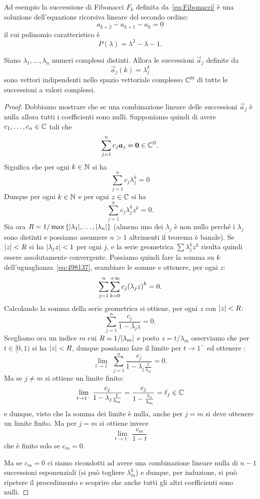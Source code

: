 Ad esempio la successione di Fibonacci $F_k$ definita da~\eqref{eq:Fibonacci}
è una soluzione dell'equazione ricorsiva lineare del secondo ordine:
\[
   a_{k+2} - a_{k+1} - a_{k} = 0
\]
il cui polinomio caratteristico è
\[
  P(\lambda) = \lambda^2 - \lambda - 1.
\]

\begin{theorem}
\label{th:indipendenza_successioni_esponenziali}
Siano $\lambda_1, \dots, \lambda_n$ numeri complessi distinti. Allora
le successioni $\vec a_j$ definite da
\[
  \vec a_j (k) = \lambda_j^k
\]
sono vettori indipendenti nello spazio vettoriale complesso ${\mathbb C}^{\mathbb N}$ di tutte le
successioni a valori complessi.
\end{theorem}
%
\begin{proof}
Dobbiamo mostrare che se una combinazione lineare delle
successioni $\vec a_j$ è nulla allora tutti i coefficienti
sono nulli.
Supponiamo quindi di avere $c_1, \dots, c_n\in {\mathbb C}$ tali che
\[
  \sum_{j=1}^n c_j \boldsymbol a_j = \boldsymbol 0 \in {\mathbb C}^{\mathbb N}.
\]
Significa che per ogni $k\in {\mathbb N}$ si ha
\begin{equation}\label{eq:47862}
  \sum_{j=1}^n c_j \lambda_j^k = 0
\end{equation}
Dunque per ogni $k\in {\mathbb N}$ e per ogni $z\in {\mathbb C}$ si ha
\begin{equation}\label{eq:498137}
  \sum_{j=1}^n c_j \lambda_j^k z^k = 0.
\end{equation}
Sia ora $R=1/\max{\left\{ {\left|\lambda_1\right|}, \dots, {\left|\lambda_n\right|} \right\}}$ (almeno uno dei $\lambda_j$
è non nullo perché i $\lambda_j$ sono distinti e possiamo assumere
$n>1$ altrimenti il teorema è banale).
Se ${\left|z\right|}<R$ si ha ${\left|\lambda_j z\right|}< 1$ per ogni $j$,
e la serie geometrica $\sum \lambda_j^k z^k$ risulta quindi essere
assolutamente convergente. Possiamo quindi fare la somma su $k$
dell'uguaglianza~\eqref{eq:498137}, scambiare le somme e ottenere,
per ogni $z$:
\[
  \sum_{j=1}^n \sum_{k=0}^{+\infty} c_j {\left( \lambda_j z \right)}^k = 0.
\]
Calcolando la somma della serie geometrica si ottiene, per ogni $z$
con ${\left|z\right|}<R$:
\[
\sum_{j=1}^n \frac{c_j}{1-\lambda_j z} = 0.
\]
Scegliamo ora un indice $m$ cui $R = 1/{\left|\lambda_m\right|}$ e
posto $z = t / \lambda_m$ osserviamo che per $t\in[0,1)$
si ha ${\left|z\right|} < R$, dunque possiamo fare il limite
per $t\to 1^-$ ed ottenere :
\[
  \lim_{t\to 1^-}
  \sum_{j=1}^n \frac{c_j}{1- \lambda_j \frac{t}{\lambda_m} } = 0.
\]
Ma se $j\neq m$ si ottiene un limite finito:
\[
  \lim_{t\to 1^-} \frac{c_j}{1- \lambda_j \frac{t}{\lambda_m} }
  = \frac{c_j}{1 - \frac{\lambda_j}{\lambda_m}} = \ell_j \in {\mathbb C}
\]
e dunque, visto che la somma dei limite è nulla,
anche per $j=m$ si deve ottenere un limite finito.
Ma per $j=m$ si ottiene invece
\[
  \lim_{t\to 1^-}\frac{c_m}{1 - t}
\]
che è finito solo se $c_m=0$.

Ma se $c_m=0$ ci siamo ricondotti ad avere una combinazione lineare
nulla di $n-1$ successioni esponenziali (si può togliere $\lambda_m^k$)
e dunque, per induzione, si può ripetere il procedimento e scoprire
che anche tutti gli altri coefficienti sono nulli.
\end{proof}

